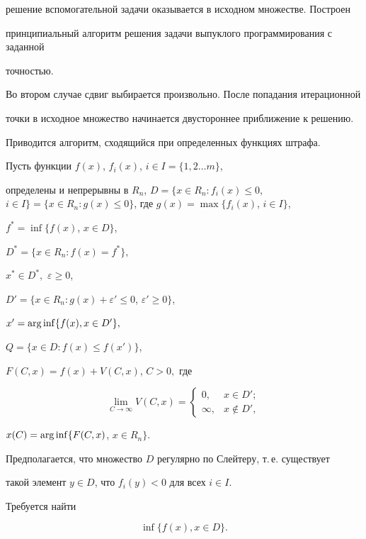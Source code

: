решение вспомогательной задачи оказывается в исходном множестве. Построен


принципиальный алгоритм решения задачи выпуклого программирования с заданной 


точностью.


Во втором случае сдвиг выбирается произвольно. После попадания итерационной 


точки в исходное множество начинается двустороннее приближение к решению.


Приводится алгоритм, сходящийся при определенных функциях штрафа.





Пусть функции $f(x)$, $f_i(x)$, $i\in I=\{1,2\dotsc m\}$, 


определены и непрерывны в $R_n$, $D=\{x\in R_n:f_i(x)\leq 0$, $i\in I\}=


\{x\in R_n:g(x)\leq0\}$, где $g(x)=\max\{f_i(x)$, $i\in I\}$,


$f^*=\inf\{f(x)$, $x\in D\}$, 


$D^*=\{x\in R_n: f(x)=f^*\},$


$x^*\in D^*,$ $\varepsilon\geq0$, 


$D'=\{x\in R_n: g(x)+\varepsilon'\leq0$, $\varepsilon'\geq0\}$, 


$x'=\operatorname{arg\,inf}\{f(x),x\in D'\},$ 


$Q=\{x\in D: f(x)\leq f(x')\}$, 


$F(C,x)=f(x)+V(C,x)$, $C>0,$ где 


$$


\lim_{C\to\infty}V(C,x)=\begin{cases}


0, & x\in D';\\


\infty, & x\notin D',


\end{cases} 


$$


$x(C)=\operatorname{arg\,inf}\{F(C,x)$, $x\in R_n\}$. 


Предполагается, что множество $D$ регулярно по Слейтеру, т.\,е. существует


такой элемент $y\in D$, что $f_i(y)<0$ для всех $i\in I$.


Требуется найти


\begin{equation}\label{Zad1}


\inf\{f(x), x\in D\}.


\end{equation}





